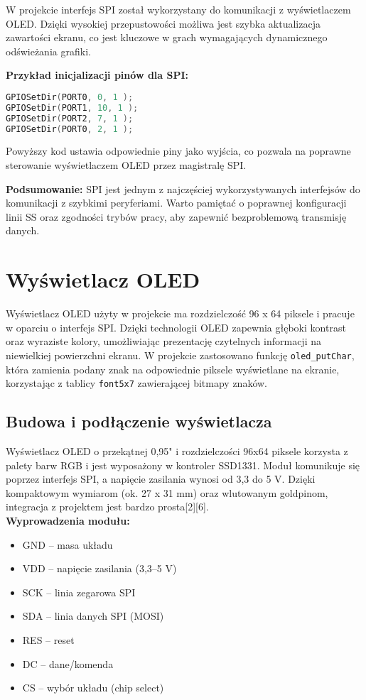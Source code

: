 \documentclass[a4paper,12pt]{report}
\begin{document}
W projekcie interfejs SPI został wykorzystany do komunikacji z wyświetlaczem OLED. Dzięki wysokiej przepustowości możliwa jest szybka aktualizacja zawartości ekranu, co jest kluczowe w grach wymagających dynamicznego odświeżania grafiki.

\textbf{Przykład inicjalizacji pinów dla SPI:}
\begin{lstlisting}[language=C]
GPIOSetDir(PORT0, 0, 1 );
GPIOSetDir(PORT1, 10, 1 );
GPIOSetDir(PORT2, 7, 1 );
GPIOSetDir(PORT0, 2, 1 );
\end{lstlisting}
Powyższy kod ustawia odpowiednie piny jako wyjścia, co pozwala na poprawne sterowanie wyświetlaczem OLED przez magistralę SPI.

\textbf{Podsumowanie:}  
SPI jest jednym z najczęściej wykorzystywanych interfejsów do komunikacji z szybkimi peryferiami. Warto pamiętać o poprawnej konfiguracji linii SS oraz zgodności trybów pracy, aby zapewnić bezproblemową transmisję danych.

\section{Wyświetlacz OLED}

Wyświetlacz OLED użyty w projekcie ma rozdzielczość 96 x 64 piksele i pracuje w oparciu o interfejs SPI. Dzięki technologii OLED zapewnia głęboki kontrast oraz wyraziste kolory, umożliwiając prezentację czytelnych informacji na niewielkiej powierzchni ekranu. W projekcie zastosowano funkcję \texttt{oled\_putChar}, która zamienia podany znak na odpowiednie piksele wyświetlane na ekranie, korzystając z tablicy \texttt{font5x7} zawierającej bitmapy znaków.

\subsection*{Budowa i podłączenie wyświetlacza}

Wyświetlacz OLED o przekątnej 0,95" i rozdzielczości 96x64 piksele korzysta z palety barw RGB i jest wyposażony w kontroler SSD1331. Moduł komunikuje się poprzez interfejs SPI, a napięcie zasilania wynosi od 3,3 do 5 V. Dzięki kompaktowym wymiarom (ok. 27 x 31 mm) oraz wlutowanym goldpinom, integracja z projektem jest bardzo prosta[2][6].\\

\textbf{Wyprowadzenia modułu:}
\begin{itemize}
    \item GND – masa układu
    \item VDD – napięcie zasilania (3,3–5 V)
    \item SCK – linia zegarowa SPI
    \item SDA – linia danych SPI (MOSI)
    \item RES – reset
    \item DC – dane/komenda
    \item CS – wybór układu (chip select)
\end{itemize}
\end{document}
